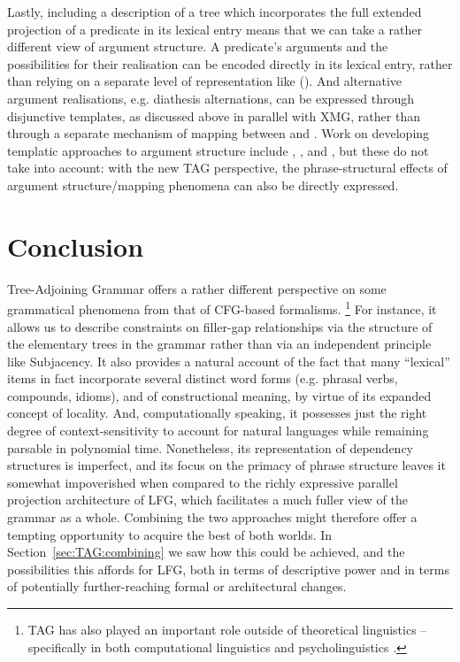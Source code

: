 \documentclass[output=paper,hidelinks]{langscibook}
\begin{document}
Lastly, including a description of a tree which incorporates the full extended
projection of a predicate in its lexical entry means that we can take a rather
different view of argument structure. A predicate's arguments and the
possibilities for their realisation can be encoded directly in its lexical
entry, rather than relying on a separate level of representation like 
(). And alternative argument
realisations, e.g. diathesis alternations, can be expressed through disjunctive
templates, as discussed above in parallel with XMG, rather than through a
separate mechanism of mapping between  and \fstruc. Work on developing
templatic approaches to argument structure include
\citet{AsudGior12}, \citet{findlay2017mapping,Findlay2020}, and \citet{przep2017hierarchical}, but
these do not take \cstruc{} into account: with the new TAG perspective, the
phrase-structural effects of argument structure\slash mapping phenomena can also
be directly expressed.



\section{Conclusion}
\label{sec:TAG:conclusion}

Tree-Adjoining Grammar offers a rather different perspective on some grammatical
phenomena from that of CFG-based formalisms.%
%
\footnote{TAG has also played an important role outside of theoretical
  linguistics -- specifically in both computational linguistics \citep[see
  e.g.][]{kallmeyer:tulipa,kasai:tag-parsing,koller:feature} and
  psycholinguistics \citep[see
  e.g.][]{ferreira:syntax-in-production,ferreira:disfluencies}.}
%
For instance, it allows us to describe constraints on filler-gap relationships
via the structure of the elementary trees in the grammar rather than via an
independent principle like Subjacency. It also provides a natural account of the
fact that many ``lexical'' items in fact incorporate several distinct word forms
(e.g. phrasal verbs, compounds, idioms), and of constructional meaning, by
virtue of its expanded concept of locality. And, computationally speaking, it
possesses just the right degree of context-sensitivity to account for natural
languages while remaining parsable in polynomial time. Nonetheless, its
representation of dependency structures is imperfect, and its focus on the
primacy of phrase structure leaves it somewhat impoverished when compared to the
richly expressive parallel projection architecture of LFG, which facilitates a
much fuller view of the grammar as a whole. Combining the two approaches might
therefore offer a tempting opportunity to acquire the best of both worlds. In
Section~\ref{sec:TAG:combining} we saw how this could be achieved, and the
possibilities this affords for LFG, both in terms of descriptive power and in
terms of potentially further-reaching formal or architectural changes.%
\end{document}
